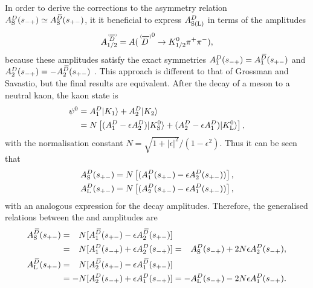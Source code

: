 
In order to derive the corrections to the asymmetry relation $A_{\rm S}^{D}(s_{-+})\simeq A_{\rm S}^{{\kern 0.18em\overline{\kern -0.18em D}}}(s_{+-})$, it it beneficial to express $A^{D}_\text{S(L)}$ in terms of the amplitudes
\begin{align}
   A_{1/2}^{\scaleto{\DorDbar}{9pt}} = 
   A({\DorDbar}^0\to K^0_\text{1/2} \pi^+\pi^-),
\end{align}
 because these amplitudes satisfy the exact symmetries 
 $A_1^{{D}}(s_{-+}) = A_1^{{{\kern 0.18em\overline{\kern -0.18em D}}}}(s_{+-})$
and
 $A_2^{{D}}(s_{-+}) = -A_2^{{{\kern 0.18em\overline{\kern -0.18em D}}}}(s_{+-})$ . This approach is different to that of Grossman and Savastio, but the final results are equivalent. 
 After the decay of a \Dz meson to a neutral kaon, the kaon state is
\begin{align}
\begin{split}
    \psi^0 &= A^{D}_1 |K_1\rangle + A^{D}_2|K_2\rangle \\
    &= N\left[(A^{D}_1-\epsilon A^{D}_2)|{{K}^0_{\mathrm{S}}}\rangle
    + (A^{D}_2-\epsilon A^{D}_1)|{{K}^0_{\mathrm{L}}}\rangle\right],
\end{split}
\end{align}
with the normalisation constant $N=\sqrt{1+|\epsilon|^2}/(1-\epsilon^2)$. Thus it can be seen that
\begin{align}
\begin{split}\label{eq:A12toKS}
    A^{D}_\text{S}(s_{+-}) &= N\left[(A^{D}_1(s_{+-})-\epsilon A^{D}_2(s_{+-}))\right], \\
    A^{D}_\text{L}(s_{+-}) &= N\left[(A^{D}_2(s_{+-})-\epsilon A^{D}_1(s_{+-}))\right],
\end{split}
\end{align}
with an analogous expression for the \Dzb decay amplitudes. Therefore, the  generalised relations between the \Dz and \Dzb amplitudes are
\begin{align}
\begin{split}\label{eq:DDbar_relations}
    A_{\rm S}^{{\kern 0.18em\overline{\kern -0.18em D}}}(s_{+-}) &= \phantom{-}N[A^{\kern 0.18em\overline{\kern -0.18em D}}_1(s_{+-})-\epsilon A^{\kern 0.18em\overline{\kern -0.18em D}}_2(s_{+-})]
    \\
    &= \phantom{-}N[A^{D}_1(s_{-+})+\epsilon A^{D}_2(s_{-+})]  = \phantom{-}A_{\rm S}^{D}(s_{-+}) + 2N\epsilon A^{D}_2(s_{-+}),
    \\
    A_{\rm L}^{{\kern 0.18em\overline{\kern -0.18em D}}}(s_{+-}) &= \phantom{-}N [A^{\kern 0.18em\overline{\kern -0.18em D}}_2(s_{+-})-\epsilon A^{\kern 0.18em\overline{\kern -0.18em D}}_1(s_{+-}) ]
    \\
    & = -N[A^{D}_2(s_{-+})+\epsilon A^{D}_1(s_{-+})] = -A_{\rm L}^{D}(s_{-+}) - 2N\epsilon A^{D}_1(s_{-+}).
\end{split}
\end{align} 

